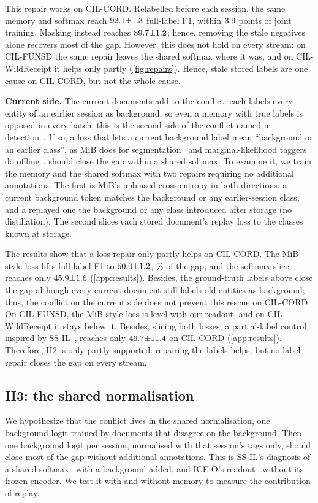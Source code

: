 \documentclass[10pt,twocolumn,letterpaper]{article}
\newcommand{\runin}[1]{\par\addvspace{0.7ex plus .3ex minus .1ex}\noindent\textbf{#1}\hspace{1em}\ignorespaces}
\begin{document}
This repair works on CIL-CORD. Relabelled before each session, the same memory and softmax reach $92.1{\pm}1.3$ full-label F1, within $3.9$ points of joint training. Masking instead reaches $89.7{\pm}1.2$; hence, removing the stale negatives alone recovers most of the gap. However, this does not hold on every stream: on CIL-FUNSD the same repair leaves the shared softmax where it was, and on CIL-WildReceipt it helps only partly (\cref{fig:repairs}). Hence, stale stored labels are one cause on CIL-CORD, but not the whole cause.

\runin{Current side.}\label{sec:h2} The current documents add to the conflict: each labels every entity of an earlier session as background, so even a memory with true labels is opposed in every batch; this is the second side of the conflict named in detection~\citep{mo2024bpf}. If so, a loss that lets a current background label mean ``background or an earlier class'', as MiB does for segmentation~\citep{cermelli2020mib} and marginal-likelihood taggers do offline~\citep{greenberg2018marginal}, should close the gap within a shared softmax. To examine it, we train the memory and the shared softmax with two repairs requiring no additional annotations. The first is MiB's unbiased cross-entropy in both directions: a current background token matches the background or any earlier-session class, and a replayed one the background or any class introduced after storage (no distillation). The second slices each stored document's replay loss to the classes known at storage.

The results show that a loss repair only partly helps on CIL-CORD. The MiB-style loss lifts full-label F1 to $60.0{\pm}1.2$, \nMibShareFull\% of the gap, and the softmax slice reaches only $45.9{\pm}1.6$ (\cref{app:results}). Besides, the ground-truth labels above close the gap although every current document still labels old entities as background; thus, the conflict on the current side does not prevent this rescue on CIL-CORD. On CIL-FUNSD, the MiB-style loss is level with our readout, and on CIL-WildReceipt it stays below it. Besides, slicing both losses, a partial-label control inspired by SS-IL~\citep{ahn2021ssil}, reaches only $46.7{\pm}11.4$ on CIL-CORD (\cref{app:results}). Therefore, H2 is only partly supported: repairing the labels helps, but no label repair closes the gap on every stream.

\subsection{H3: the shared normalisation}
\label{sec:h3}
We hypothesize that the conflict lives in the shared normalisation, one background logit trained by documents that disagree on the background. Then one background logit per session, normalised with that session's tags only, should close most of the gap without additional annotations. This is SS-IL's diagnosis of a shared softmax~\citep{ahn2021ssil} with a background added, and ICE-O's readout~\citep{liu2023ice} without its frozen encoder. We test it with and without memory to measure the contribution of replay.
\end{document}

